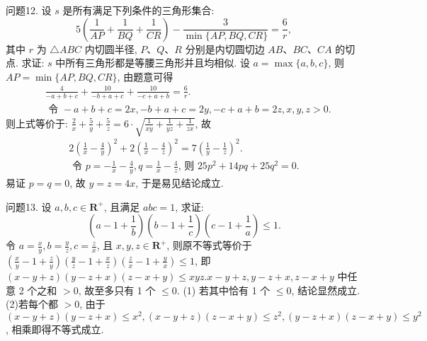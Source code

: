 问题12. 设 $s$ 是所有满足下列条件的三角形集合:
$$
5\left(\frac{1}{A P}+\frac{1}{B Q}+\frac{1}{C R}\right)-\frac{3}{\min \{A P, B Q, C R\}}=\frac{6}{r},
$$
其中 $r$ 为 $\triangle A B C$ 内切圆半径, $P 、 Q 、 R$ 分别是内切圆切边 $A B 、 B C 、 C A$ 的切点.
求证: $s$ 中所有三角形都是等腰三角形并且均相似.
设 $a=\max \{a, b, c\}$, 则 $A P=\min \{A P, B Q, C R\}$, 由题意可得
$$
\begin{aligned}
& \frac{4}{-a+b+c}+\frac{10}{-b+a+c}+\frac{10}{-c+a+b}=\frac{6}{r} . \\
& \text { 令 }-a+b+c=2 x,-b+a+c=2 y,-c+a+b=2 z, x, y, z>0 .
\end{aligned}
$$
则上式等价于: $\frac{2}{x}+\frac{5}{y}+\frac{5}{z}=6 \cdot \sqrt{\frac{1}{x y}+\frac{1}{y z}+\frac{1}{z x}}$, 故
$$
\begin{gathered}
2\left(\frac{1}{x}-\frac{4}{y}\right)^2+2\left(\frac{1}{x}-\frac{4}{z}\right)^2=7\left(\frac{1}{y}-\frac{1}{z}\right)^2 . \\
\text { 令 } p=-\frac{1}{x}-\frac{4}{y}, q=\frac{1}{x}-\frac{4}{z} \text {, 则 } 25 p^2+14 p q+25 q^2=0 .
\end{gathered}
$$
易证 $p=q=0$, 故 $y=z=4 x$, 于是易见结论成立.



问题13. 设 $a, b, c \in \mathbf{R}^{+}$, 且满足 $a b c=1$, 求证:
$$
\left(a-1+\frac{1}{b}\right)\left(b-1+\frac{1}{c}\right)\left(c-1+\frac{1}{a}\right) \leqslant 1 .
$$
令 $a=\frac{x}{y}, b=\frac{y}{z}, c=\frac{z}{x}$, 且 $x, y, z \in \mathbf{R}^{+}$, 则原不等式等价于 $\left(\frac{x}{y}-1+\frac{z}{y}\right)\left(\frac{y}{z}-1+\frac{x}{z}\right)\left(\frac{z}{x}-1+\frac{y}{x}\right) \leqslant 1$, 即 $(x-y+z)(y-z+x) (z-x+y) \leqslant x y z . x-y+z, y-z+x, z-x+y$ 中任意 2 个之和 $>0$, 故至多只有 1 个 $\leqslant 0$.
(1) 若其中恰有 1 个 $\leqslant 0$, 结论显然成立.
(2)若每个都 $>0$, 由于 $(x-y+z)(y-z+x) \leqslant x^2,(x-y+z)(z- x+y) \leqslant z^2,(y-z+x)(z-x+y) \leqslant y^2$, 相乘即得不等式成立.



